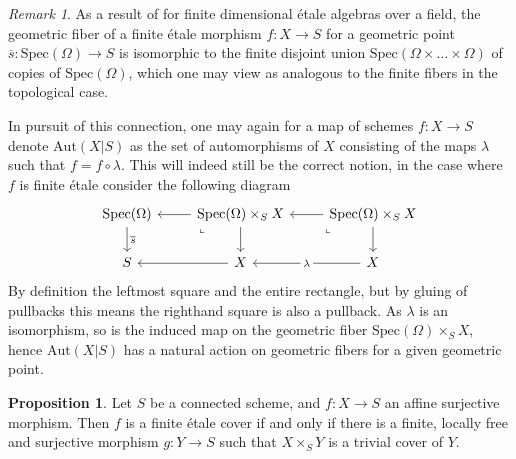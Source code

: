 \documentclass{article}
\theoremstyle{definition}
\newtheorem{proposition}[theorem]{Proposition}
\theoremstyle{remark}
\newtheorem*{remark}{Remark}
\begin{document}
\begin{remark}
As a result of  for finite dimensional \'etale algebras over a field, the geometric fiber of a finite \'etale morphism $f: X \to S$ for a geometric point $\overline{s} : \text{Spec}(\Omega) \to S $ is isomorphic to the finite disjoint union $\text{Spec}(\Omega \times \dots \times \Omega)$ of copies of $\text{Spec}(\Omega)$, which one may view as analogous to the finite fibers in the topological case.
\end{remark}

In pursuit of this connection, one may again for a map of schemes $f: X \to S$ denote $\text{Aut}(X|S)$ as the set of automorphisms of $X$ consisting of the maps $\lambda$ such that $f  = f \circ \lambda$.
This will indeed still be the correct notion, in the case where $f$ is finite \'etale consider the following diagram
\[\begin{tikzcd}
	{\text{Spec}(\Omega)} & {\text{Spec}(\Omega)\times_S X} & {\text{Spec}(\Omega)\times_S X} \\
	S & X & X
	\arrow["{\overline{s}}", from=1-1, to=2-1]
	\arrow[from=1-2, to=1-1]
	\arrow["\lrcorner"{anchor=center, pos=0.125, rotate=-90}, draw=none, from=1-2, to=2-1]
	\arrow[from=1-2, to=2-2]
	\arrow[from=1-3, to=1-2]
	\arrow["\lrcorner"{anchor=center, pos=0.125, rotate=-90}, draw=none, from=1-3, to=2-2]
	\arrow[from=1-3, to=2-3]
	\arrow[from=2-2, to=2-1]
	\arrow["\lambda"{description}, from=2-3, to=2-2]
\end{tikzcd}\]
By definition the leftmost square and the entire rectangle, but by gluing of pullbacks this means the righthand square is also a pullback.
As $\lambda$ is an isomorphism, so is the induced map on the geometric fiber $\text{Spec}(\Omega)\times_S X$, hence $\text{Aut}(X|S)$ has a natural action on geometric fibers for a given geometric point.

\begin{proposition}
	Let $S$ be a connected scheme, and $f\colon X \to S$ an affine surjective morphism.
	Then $f$ is a finite \'etale cover if and only if there is a finite, locally free and surjective morphism $g: Y \to S$ such that $X \times_S Y$ is a trivial cover of $Y$.
\end{proposition}
\end{document}
